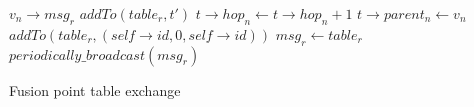 \begin{algorithm}
\begin{algorithmic}
\REQUIRE \(v_n\rightarrow msg_r\)
			\STATE \(addTo(table_r, t')\)
		\ENDIF
					\STATE \(t\rightarrow hop_n \gets t\rightarrow hop_n+1\)
					\STATE \(t\rightarrow parent_n \gets v_n\)
				\ENDIF
			\ENDIF
		\ENDFOR
	\ENDFOR
		\STATE \(addTo(table_r, (self\rightarrow id, 0, self\rightarrow id))\)
	\ENDIF
	\STATE \(msg_r \gets table_r\)
	\STATE \(periodically\_broadcast(msg_r)\)
\end{algorithmic}
\caption{Fusion point table exchange}
\label{algo:table_r}
\end{algorithm}

